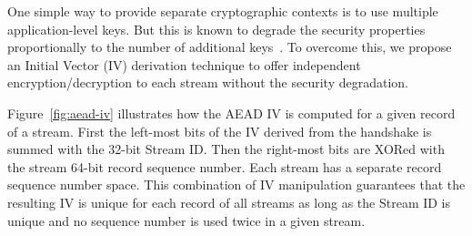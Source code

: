 One simple way to provide separate cryptographic contexts is to use multiple application-level
keys. But this is known to degrade the security properties proportionally to the number of
additional keys~\cite{chatterjee2011another}. To overcome this, we propose an
Initial Vector (IV) derivation technique to offer independent
encryption/decryption to each stream without the security degradation.

Figure~\ref{fig:aead-iv} illustrates how the AEAD IV is computed for a 
given \tcpls record of a \tcpls stream. First the left-most bits of the IV derived from the \tls handshake
is summed with the 32-bit \tcpls Stream ID. Then the right-most bits are XORed with the
stream 64-bit record sequence number. Each \tcpls stream has a separate record
sequence number space. This combination of IV manipulation guarantees that the
resulting IV is unique for each record of all \tcpls streams as long as the
Stream ID is unique and no sequence number is used twice in a given stream.


%

